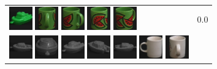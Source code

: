 {\begin{figure}[p]
\begin{tabular}{m{11cm} | m{3cm} |}
\includegraphics[width=1cm]{coil/beeld-57.eps}
\includegraphics[width=1cm]{coil/beeld-35.eps}
\includegraphics[width=1cm]{coil/beeld-34.eps}
\includegraphics[width=1cm]{coil/beeld-32.eps}
\includegraphics[width=1cm]{coil/beeld-33.eps}
& {\scriptsize 0.0}
\\
\includegraphics[width=1cm]{coil/beeld-24.eps}
\includegraphics[width=1cm]{coil/beeld-28.eps}
\includegraphics[width=1cm]{coil/beeld-29.eps}
\includegraphics[width=1cm]{coil/beeld-25.eps}
\includegraphics[width=1cm]{coil/beeld-27.eps}
\includegraphics[width=1cm]{coil/beeld-37.eps}
\includegraphics[width=1cm]{coil/beeld-41.eps}

\end{tabular}
\end{figure}}
